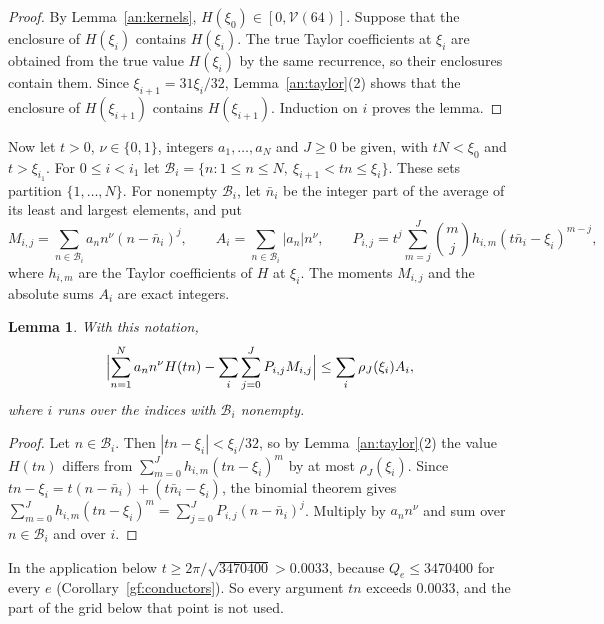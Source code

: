 \documentclass[11pt]{amsart}
\numberwithin{equation}{section}
\newtheorem{lemma}[equation]{Lemma}
\theoremstyle{definition}
\theoremstyle{remark}
\begin{document}
\begin{proof}
By Lemma~\ref{an:kernels}, $H(\xi_0)\in[0,\mathcal V(64)]$. Suppose that
the enclosure of $H(\xi_i)$ contains $H(\xi_i)$. The true Taylor
coefficients at $\xi_i$ are obtained from the true value $H(\xi_i)$ by the
same recurrence, so their enclosures contain them. Since
$\xi_{i+1}=31\xi_i/32$, Lemma~\ref{an:taylor}(2) shows that the enclosure
of $H(\xi_{i+1})$ contains $H(\xi_{i+1})$. Induction on $i$ proves the
lemma.
\end{proof}

Now let $t>0$, $\nu\in\{0,1\}$, integers $a_1,\ldots,a_N$ and $J\ge0$ be
given, with $tN<\xi_0$ and $t>\xi_{i_1}$. For $0\le i<i_1$ let
$\mathcal B_i=\{n:1\le n\le N,\ \xi_{i+1}<tn\le\xi_i\}$. These sets
partition $\{1,\ldots,N\}$. For nonempty $\mathcal B_i$, let $\bar n_i$ be
the integer part of the average of its least and largest elements, and put
\[
 M_{i,j}=\sum_{n\in\mathcal B_i}a_nn^\nu(n-\bar n_i)^j,\qquad
 A_i=\sum_{n\in\mathcal B_i}|a_n|n^\nu,\qquad
 P_{i,j}=t^j\sum_{m=j}^J\binom mjh_{i,m}(t\bar n_i-\xi_i)^{m-j},
\]
where $h_{i,m}$ are the Taylor coefficients of $H$ at $\xi_i$. The moments
$M_{i,j}$ and the absolute sums $A_i$ are exact integers.

\begin{lemma}\label{an:binning}
With this notation,
\begin{equation}\label{an:bin-sum}
 \Bigl|\sum_{n=1}^Na_nn^\nu H(tn)-\sum_i\sum_{j=0}^JP_{i,j}M_{i,j}\Bigr|
 \le\sum_i\rho_J(\xi_i)A_i,
\end{equation}
where $i$ runs over the indices with $\mathcal B_i$ nonempty.
\end{lemma}

\begin{proof}
Let $n\in\mathcal B_i$. Then $|tn-\xi_i|<\xi_i/32$, so by
Lemma~\ref{an:taylor}(2) the value $H(tn)$ differs from
$\sum_{m=0}^Jh_{i,m}(tn-\xi_i)^m$ by at most $\rho_J(\xi_i)$. Since
$tn-\xi_i=t(n-\bar n_i)+(t\bar n_i-\xi_i)$, the binomial theorem gives
$\sum_{m=0}^Jh_{i,m}(tn-\xi_i)^m=\sum_{j=0}^JP_{i,j}(n-\bar n_i)^j$.
Multiply by $a_nn^\nu$ and sum over $n\in\mathcal B_i$ and over $i$.
\end{proof}

In the application below $t\ge2\pi/\sqrt{3470400}>0.0033$, because
$Q_e\le3470400$ for every $e$ (Corollary~\ref{gf:conductors}). So every argument
$tn$ exceeds $0.0033$, and the part of the grid below that point is not
used.
\end{document}

